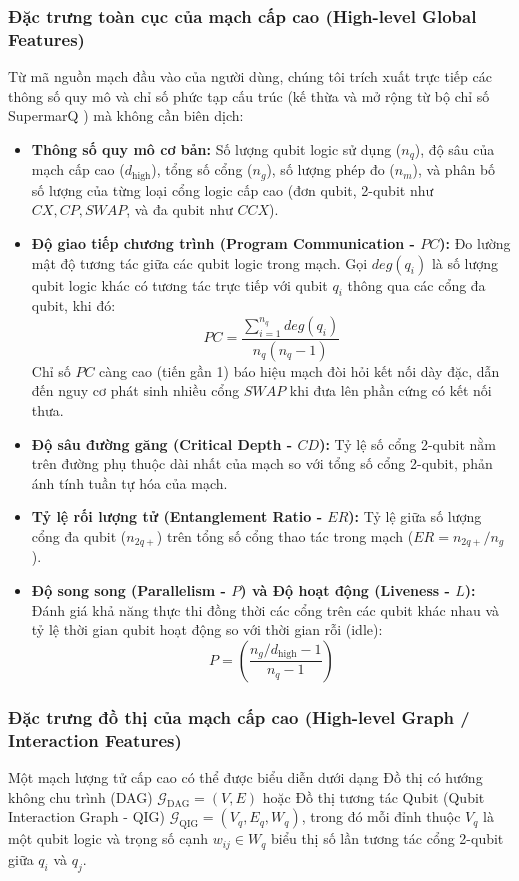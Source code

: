 \documentclass[11pt, a4paper]{article}
\begin{document}
\subsubsection{Đặc trưng toàn cục của mạch cấp cao (High-level Global Features)}
Từ mã nguồn mạch đầu vào của người dùng, chúng tôi trích xuất trực tiếp các thông số quy mô và chỉ số phức tạp cấu trúc (kế thừa và mở rộng từ bộ chỉ số SupermarQ \cite{tomesh2022supermarq}) mà không cần biên dịch:
\begin{itemize}
    \item \textbf{Thông số quy mô cơ bản:} Số lượng qubit logic sử dụng ($n_q$), độ sâu của mạch cấp cao ($d_{\text{high}}$), tổng số cổng ($n_g$), số lượng phép đo ($n_m$), và phân bố số lượng của từng loại cổng logic cấp cao (đơn qubit, 2-qubit như $CX, CP, SWAP$, và đa qubit như $CCX$).
    \item \textbf{Độ giao tiếp chương trình (Program Communication - $PC$):} Đo lường mật độ tương tác giữa các qubit logic trong mạch. Gọi $deg(q_i)$ là số lượng qubit logic khác có tương tác trực tiếp với qubit $q_i$ thông qua các cổng đa qubit, khi đó:
    \begin{equation}
        PC = \frac{\sum_{i=1}^{n_q} deg(q_i)}{n_q (n_q - 1)}
    \end{equation}
    Chỉ số $PC$ càng cao (tiến gần 1) báo hiệu mạch đòi hỏi kết nối dày đặc, dẫn đến nguy cơ phát sinh nhiều cổng $SWAP$ khi đưa lên phần cứng có kết nối thưa.
    \item \textbf{Độ sâu đường găng (Critical Depth - $CD$):} Tỷ lệ số cổng 2-qubit nằm trên đường phụ thuộc dài nhất của mạch so với tổng số cổng 2-qubit, phản ánh tính tuần tự hóa của mạch.
    \item \textbf{Tỷ lệ rối lượng tử (Entanglement Ratio - $ER$):} Tỷ lệ giữa số lượng cổng đa qubit ($n_{2q+}$) trên tổng số cổng thao tác trong mạch ($ER = n_{2q+} / n_g$).
    \item \textbf{Độ song song (Parallelism - $P$) và Độ hoạt động (Liveness - $L$):} Đánh giá khả năng thực thi đồng thời các cổng trên các qubit khác nhau và tỷ lệ thời gian qubit hoạt động so với thời gian rỗi (idle):
    \begin{equation}
        P = \left( \frac{n_g / d_{\text{high}} - 1}{n_q - 1} \right)
    \end{equation}
\end{itemize}

\subsubsection{Đặc trưng đồ thị của mạch cấp cao (High-level Graph / Interaction Features)}
Một mạch lượng tử cấp cao có thể được biểu diễn dưới dạng Đồ thị có hướng không chu trình (DAG) $\mathcal{G}_{\text{DAG}} = (V, E)$ hoặc Đồ thị tương tác Qubit (Qubit Interaction Graph - QIG) $\mathcal{G}_{\text{QIG}} = (V_q, E_q, W_q)$, trong đó mỗi đỉnh thuộc $V_q$ là một qubit logic và trọng số cạnh $w_{ij} \in W_q$ biểu thị số lần tương tác cổng 2-qubit giữa $q_i$ và $q_j$.
\end{document}
